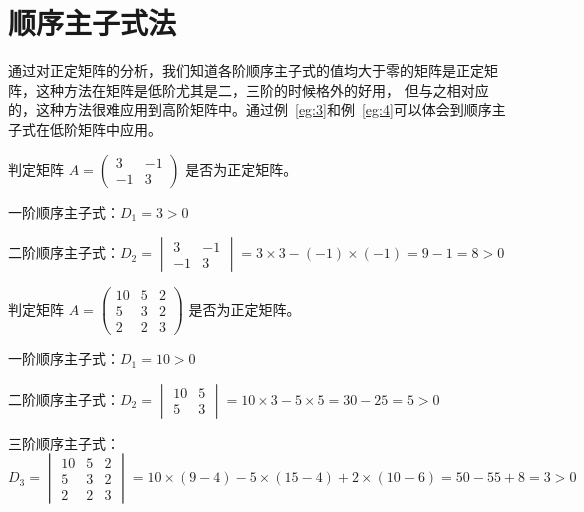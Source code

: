 \section{顺序主子式法}
通过对正定矩阵的分析，我们知道各阶顺序主子式的值均大于零的矩阵是正定矩阵，这种方法在矩阵是低阶尤其是二，三阶的时候格外的好用，
但与之相对应的，这种方法很难应用到高阶矩阵中。通过例~\ref{eg:3}和例~\ref{eg:4}可以体会到顺序主子式在低阶矩阵中应用。
\begin{example}\label{eg:3}
  判定矩阵 $A=\begin{pmatrix}3&-1\\-1&3\end{pmatrix}$ 是否为正定矩阵。
\end{example}
\begin{solution}
  一阶顺序主子式：$D_1 = 3 > 0$

  二阶顺序主子式：$D_2 = \begin{vmatrix}3&-1\\-1&3\end{vmatrix} = 3\times3 - (-1)\times(-1) = 9 - 1 = 8 > 0$
\end{solution}
\begin{example}\label{eg:4}
  判定矩阵 $A=\begin{pmatrix}10&5&2\\5&3&2\\2&2&3\end{pmatrix}$ 是否为正定矩阵。
\end{example}
\begin{solution}
  一阶顺序主子式：$D_1 = 10 > 0$

  二阶顺序主子式：$D_2 = \begin{vmatrix}10&5\\5&3\end{vmatrix} = 10\times3 - 5\times5 = 30 - 25 = 5 > 0$

  三阶顺序主子式：$D_3 = \begin{vmatrix}10&5&2\\5&3&2\\2&2&3\end{vmatrix}
  =10\times(9-4)-5\times(15-4)+2\times(10-6)=50-55+8=3>0$
\end{solution}
